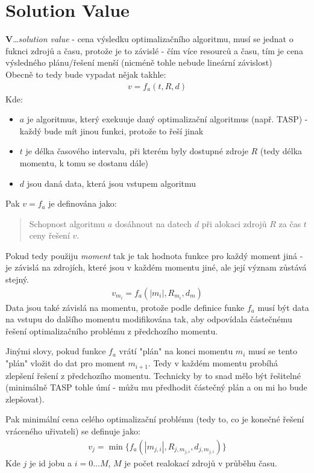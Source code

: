 \documentclass[11pt]{article}
\begin{document}
    \section{Solution Value}\label{sec:solution-value}
    \textbf{V}\ldots\textit{solution value} - cena výsledku optimalizačního algoritmu, musí se jednat o fuknci zdrojů a času,
    protože je to závislé - čím více resourců a času, tím je cena výsledného plánu/řešení menší (nicméně tohle nebude lineární závislost)\\
    Obecně to tedy bude vypadat nějak takhle:
    \begin{align*}
        v = f_{a}(t, R, d)
    \end{align*}
    Kde:
    \begin{itemize}
        \item $a$ je algoritmus, který exekuuje daný optimalizační algoritmus (např. TASP) - každý bude mít jinou funkci, protože to řeší jinak
        \item $t$ je délka časového intervalu, při kterém byly dostupné zdroje $R$ (tedy délka momentu, k tomu se dostanu dále)
        \item $d$ jsou daná data, která jsou vstupem algoritmu
    \end{itemize}
    Pak $v = f_{a}$ je definována jako:
    \begin{quotation}
        Schopnost algoritmu $a$ dosáhnout na datech $d$ při alokaci zdrojů $R$ za čas $t$ ceny řešení $v$.
    \end{quotation}
    Pokud tedy použiju \textit{moment} tak je tak hodnota funkce pro každý moment jiná - je závislá na zdrojích, které jsou v každém momentu jiné,
    ale její význam zůstává stejný.
    \begin{align*}
        v_{m_{i}} = f_{a}(|m_{i}|, R_{m_{i}}, d_{m})
    \end{align*}
    Data jsou také závislá na momentu, protože podle definice funke $f_{a}$ musí být data na vstupu do dalšího momentu modifikována tak,
    aby odpovídala částečnému řešení optimalizačního problému z předchozího momentu.

    Jinými slovy, pokud funkce $f_a$ vrátí "plán" na konci momentu $m_i$ musí se tento "plán" vložit do dat pro moment $m_{i+1}$.
    Tedy v každém momentu probíhá zlepšení řešení z předchozího momentu.
    Technicky by to snad mělo být řešitelné (minimálně TASP tohle úmí - můžu mu předhodit částečný plán a on mi ho bude zlepšovat).

    Pak minimální cena celého optimalizační problému (tedy to, co je konečné řešení vráceného uřivateli) se definuje jako:
    \begin{align*}
        v_{j} = \min \{ f_{a}(|m_{j, i}|, R_{j, m_{j, i}}, d_{j, m_{j, i}}) \}
    \end{align*}
    Kde $j$ je id jobu a $i = 0\dots M$, $M$ je počet realokací zdrojů v průběhu času.
\end{document}
